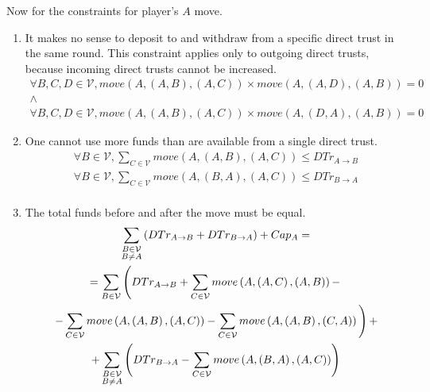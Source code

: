 Now for the constraints for player's $A$ move.

\begin{enumerate}
  \item It makes no sense to deposit to and withdraw from a specific direct trust in the same round. This constraint applies
  only to outgoing direct trusts, because incoming direct trusts cannot be increased.
  \begin{gather*}
    \forall B, C, D \in \mathcal{V}, move\left(A, \left(A, B\right), \left(A, C\right) \right) \times move\left(A, \left(A,
    D\right), \left(A, B\right) \right) = 0 \\
    \wedge \\
    \forall B, C, D \in \mathcal{V}, move\left(A, \left(A, B\right), \left(A, C\right) \right) \times move\left(A, \left(D,
    A\right), \left(A, B\right) \right) = 0
  \end{gather*}

  \item One cannot use more funds than are available from a single direct trust.
  \begin{gather*}
    \forall B \in \mathcal{V}, \sum\limits_{C \in \mathcal{V}} move\left(A, \left(A, B\right), \left(A, C\right) \right)
      \leq DTr_{A \rightarrow B} \\
    \forall B \in \mathcal{V}, \sum\limits_{C \in \mathcal{V}} move\left(A, \left(B, A\right), \left(A, C\right) \right)
      \leq DTr_{B \rightarrow A} \\
  \end{gather*}

  \item The total funds before and after the move must be equal.
  \begin{gather*}
    \sum\limits_{\substack{B \in \mathcal{V} \\ B \neq A}}\left(DTr_{A
      \rightarrow B} + DTr_{B \rightarrow A}\right) + Cap_A = \\
    = \sum\limits_{B \in \mathcal{V}}\left(DTr_{A \rightarrow B} + \sum\limits_{C \in \mathcal{V}}move\left(A, \left(A,
      C\right), \left(A, B\right) \right) - \right. \\
      \left.- \sum\limits_{C \in \mathcal{V}}move\left(A, \left(A, B\right), \left(A, C\right) \right) - \sum\limits_{C \in
      \mathcal{V}}move\left(A, \left(A, B\right), \left(C, A\right) \right) \vphantom{\sum\limits_{C \in \mathcal{V}}} \right)
      + \\
      + \sum\limits_{\substack{B \in \mathcal{V} \\ B \neq A}}\left(DTr_{B \rightarrow A} - \sum\limits_{C \in
      \mathcal{V}}move\left(A, \left(B, A\right), \left(A, C\right) \right) \right)
  \end{gather*}


\end{enumerate}
